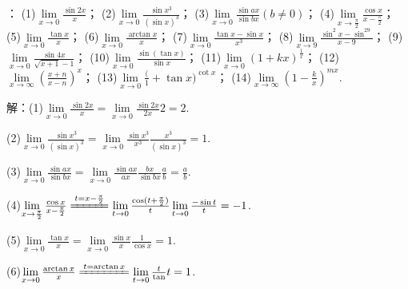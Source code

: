 \documentclass[12pt,UTF8]{ctexart}
\begin{document}
\begin{enumerate}
：
\newline
(1)$\lim\limits_{x\rightarrow0}\frac{\sin2x}{x}$；
\newline
(2)$\lim\limits_{x\rightarrow0}\frac{\sin x^3}{(\sin x)^3}$；
\newline
(3)$\lim\limits_{x\rightarrow0}\frac{\sin ax}{\sin bx}(b\neq0)$；
\newline
(4)$\lim\limits_{x\rightarrow\frac\pi2}\frac{\cos x}{x-\frac\pi2}$；
\newline
(5)$\lim\limits_{x\rightarrow0}\frac{\tan x}x$；
\newline
(6)$\lim\limits_{x\rightarrow0}\frac{\arctan x}x$；
\newline
(7)$\lim\limits_{x\rightarrow0}\frac{\tan x-\sin x}{x^3}$；
\newline
(8)$\lim\limits_{x\rightarrow9}\frac{\sin^2x-\sin^29}{x-9}$；
\newline
(9)$\lim\limits_{x\rightarrow0}\frac{\sin4x}{\sqrt{x+1}-1}$；
\newline
(10)$\lim\limits_{x\rightarrow0}\frac{\sin(\tan x)}{\sin x}$；
\newline
(11)$\lim\limits_{x\rightarrow0}(1+kx)^{\frac1x}$；
\newline
(12)$\lim\limits_{x\rightarrow\infty}(\frac{x+n}{x-n})^x$；
\newline
(13)$\lim\limits_{x\rightarrow0}\frac(1+\tan x)^{\cot x}$；
\newline
(14)$\lim\limits_{x\rightarrow\infty}(1-\frac kx)^{mx}$.

解：(1)$\lim\limits_{x\rightarrow0}\frac{\sin2x}{x}=\lim\limits_{x\rightarrow0}\frac{\sin2x}{2x}2=2$.

(2)$\lim\limits_{x\rightarrow0}\frac{\sin x^3}{(\sin x)^3}=\lim\limits_{x\rightarrow0}\frac{\sin x^3}{x^3}\frac{x^3}{(\sin x)^3}=1$.

(3)$\lim\limits_{x\rightarrow0}\frac{\sin ax}{\sin bx}=\lim\limits_{x\rightarrow0}\frac{\sin ax}{ax}\frac{bx}{\sin bx}\frac ab=\frac ab$.

(4)$\lim\limits_{x\rightarrow\frac\pi2}\frac{\cos x}{x-\frac\pi2}\xlongequal{t=x-\frac\pi2}\lim\limits_{t\rightarrow0}\frac{\cos(t+\frac\pi2)}t\lim\limits_{t\rightarrow0}\frac{-\sin t}t=-1$.

(5)$\lim\limits_{x\rightarrow0}\frac{\tan x}x=\lim\limits_{x\rightarrow0}\frac{\sin x}x\frac1{\cos x}=1$.

(6)$\lim\limits_{x\rightarrow0}\frac{\arctan x}x\xlongequal{t=\arctan x}\lim\limits_{t\rightarrow0}\frac{t}\tan t=1$.


\end{enumerate}
\end{document}
